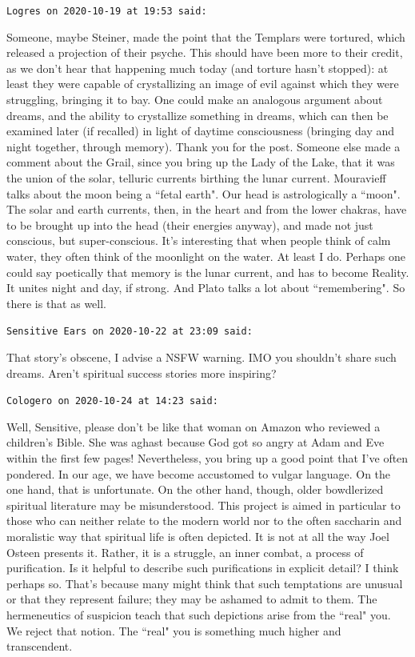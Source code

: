 \begin{footnotesize}\begin{sffamily}



\texttt{Logres on 2020-10-19 at 19:53 said: }

Someone, maybe Steiner, made the point that the Templars were tortured, which released a projection of their psyche.
This should have been more to their credit, as we don't hear that happening much today (and
torture hasn't stopped): at least they were capable of crystallizing an image of evil against
which they were struggling, bringing it to bay. One could make an analogous argument about dreams, and the ability to
crystallize something in dreams, which can then be examined later (if recalled) in light of daytime consciousness
(bringing day and night together, through memory). Thank you for the post. Someone else made a comment about the Grail,
since you bring up the Lady of the Lake, that it was the union of the solar, telluric currents birthing the lunar
current. Mouravieff talks about the moon being a ``fetal earth". Our head is astrologically a ``moon". The solar and
earth currents, then, in the heart and from the lower chakras, have to be brought up into the head (their energies
anyway), and made not just conscious, but super-conscious. It's interesting that when people think
of calm water, they often think of the moonlight on the water. At least I do. Perhaps one could say poetically that
memory is the lunar current, and has to become Reality. It unites night and day, if strong. And Plato talks a lot about
``remembering". So there is that as well.


\hfill

\texttt{Sensitive Ears on 2020-10-22 at 23:09 said: }

That story's obscene, I advise a NSFW warning. IMO you shouldn't share such
dreams. Aren't spiritual success stories more inspiring?


\hfill

\texttt{Cologero on 2020-10-24 at 14:23 said: }

Well, Sensitive, please don't be like that woman on Amazon who reviewed a
children's Bible. She was aghast because God got so angry at Adam and Eve within the first few
pages! Nevertheless, you bring up a good point that I've often pondered. In our age, we have
become accustomed to vulgar language. On the one hand, that is unfortunate. On the other hand, though, older
bowdlerized spiritual literature may be misunderstood. This project is aimed in particular to those who can neither
relate to the modern world nor to the often saccharin and moralistic way that spiritual life is often depicted. It is
not at all the way Joel Osteen presents it. Rather, it is a struggle, an inner combat, a process of purification. Is it
helpful to describe such purifications in explicit detail? I think perhaps so. That's because many
might think that such temptations are unusual or that they represent failure; they may be ashamed to admit to them. The
hermeneutics of suspicion teach that such depictions arise from the ``real" you. We reject that notion. The ``real" you
is something much higher and transcendent.


\end{sffamily}
\end{footnotesize}
